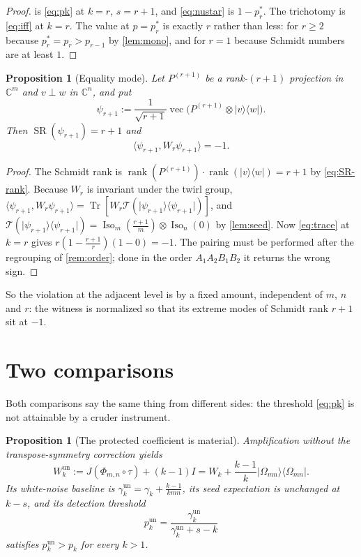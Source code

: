 \documentclass[11pt,reqno]{amsart}
\theoremstyle{plain}
\newtheorem{proposition}[theorem]{Proposition}
\theoremstyle{remark}
\DeclareMathOperator{\Tr}{Tr}
\DeclareMathOperator{\rank}{rank}
\DeclareMathOperator{\SR}{SR}
\DeclareMathOperator{\vecop}{vec}
\DeclareMathOperator{\Iso}{Iso}
\newcommand{\cT}{\mathcal T}
\newcommand{\ketbra}[2]{\lvert #1\rangle\!\langle #2\rvert}
\newcommand{\ip}[2]{\langle #1,#2\rangle}
\newcommand{\C}{\mathbb C}
\begin{document}
\begin{proof}
 is \cref{eq:pk} at $k=r$, $s=r+1$, and \cref{eq:nustar} is
$1-p_r^*$.  The trichotomy is \cref{eq:iff} at $k=r$.  The value at $p=p_r^*$ is
exactly $r$ rather than less: for $r\ge2$ because $p_r^*=p_r>p_{r-1}$ by
\cref{lem:mono}, and for $r=1$ because Schmidt numbers are at least $1$.
\end{proof}

\begin{proposition}[Equality mode]
\label{prop:equality-mode}
Let $P^{(r+1)}$ be a rank-$(r+1)$ projection in $\C^m$ and $v\perp w$ in
$\C^n$, and put
\begin{equation}
\label{eq:psir}
    \psi_{r+1}:=\frac1{\sqrt{r+1}}
    \vecop\bigl(P^{(r+1)}\otimes\ketbra vw\bigr).
\end{equation}
Then $\SR(\psi_{r+1})=r+1$ and
\begin{equation}
\label{eq:minus-one}
    \ip{\psi_{r+1}}{W_r\psi_{r+1}}=-1 .
\end{equation}
\end{proposition}

\begin{proof}
The Schmidt rank is $\rank(P^{(r+1)})\cdot\rank(\ketbra vw)=r+1$ by
\cref{eq:SR-rank}.  Because $W_r$ is invariant under the twirl group,
$\ip{\psi_{r+1}}{W_r\psi_{r+1}}=\Tr[W_r\cT(\ketbra{\psi_{r+1}}{\psi_{r+1}})]$,
and $\cT(\ketbra{\psi_{r+1}}{\psi_{r+1}})=\Iso_m(\frac{r+1}m)\otimes\Iso_n(0)$
by \cref{lem:seed}.  Now \cref{eq:trace} at $k=r$ gives
$r(1-\frac{r+1}r)(1-0)=-1$.  The pairing must be performed after the
regrouping of \cref{rem:order}; done in the order $A_1A_2B_1B_2$ it returns the
wrong sign.
\end{proof}

So the violation at the adjacent level is by a fixed amount, independent of
$m$, $n$ and $r$: the witness is normalized so that its extreme modes of
Schmidt rank $r+1$ sit at $-1$.

\section{Two comparisons}

Both comparisons say the same thing from different sides: the threshold
\cref{eq:pk} is not attainable by a cruder instrument.

\begin{proposition}[The protected coefficient is material]
\label{prop:unprotected}
Amplification without the transpose-symmetry correction yields
\begin{equation}
\label{eq:Wun}
    W_k^{\mathrm{un}}
    :=J(\Phi_{m,n}\circ\tau)+(k-1)I
    =W_k+\frac{k-1}k\ketbra{\Omega_{mn}}{\Omega_{mn}} .
\end{equation}
Its white-noise baseline is $\gamma_k^{\mathrm{un}}=\gamma_k+\frac{k-1}{kmn}$,
its seed expectation is unchanged at $k-s$, and its detection threshold
\begin{equation}
\label{eq:pun}
    p_k^{\mathrm{un}}
    =\frac{\gamma_k^{\mathrm{un}}}{\gamma_k^{\mathrm{un}}+s-k}
\end{equation}
satisfies $p_k^{\mathrm{un}}>p_k$ for every $k>1$.
\end{proposition}
\end{document}
